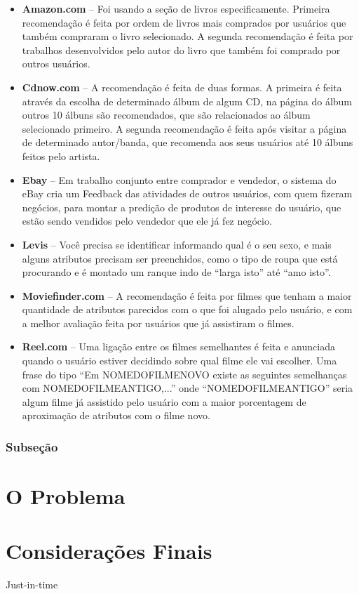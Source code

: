 \documentclass[12pt,
				openright,
				twoside,
				a4paper,
				apter=TITLE,
				section=TITLE,
				subsection=TITLE,
				chapter=TITLE,
				english,
				french,
				spanish,
				brazil]{abntex2}
\begin{document}
\begin{itemize}
\item \textbf{Amazon.com} – Foi usando a seção de livros especificamente. Primeira recomendação é feita por ordem de livros mais comprados por usuários que também compraram o livro selecionado. A segunda recomendação é feita por
trabalhos desenvolvidos pelo autor do livro que também foi comprado por outros usuários. 

\item \textbf{Cdnow.com} – A recomendação é feita de duas formas. A primeira é feita através da escolha de determinado álbum de algum CD, na página do álbum outros 10 álbuns são recomendados, que são relacionados ao álbum selecionado primeiro. A segunda recomendação é feita após visitar a página de determinado autor/banda, que recomenda aos seus usuários até 10 álbuns feitos pelo artista.

\item \textbf{Ebay} – Em trabalho conjunto entre comprador e vendedor, o sistema do eBay cria um Feedback das atividades de outros usuários, com quem fizeram negócios, para montar a predição de produtos de interesse do usuário, que estão sendo vendidos pelo vendedor que ele já fez negócio.

\item \textbf{Levis} – Você precisa se identificar informando qual é o seu sexo, e mais alguns atributos precisam ser preenchidos, como o tipo de roupa que está procurando e é montado um ranque indo de “larga isto” até “amo isto”. 

\item \textbf{Moviefinder.com} – A recomendação é feita por filmes que tenham a  maior quantidade de atributos parecidos com o que foi alugado pelo usuário,  e com a melhor avaliação feita por usuários que já assistiram o filmes. 

\item \textbf{Reel.com} – Uma ligação entre os filmes semelhantes é feita e anunciada quando o usuário estiver decidindo sobre qual filme ele vai escolher. Uma  frase do tipo “Em NOMEDOFILMENOVO existe as seguintes semelhanças  com NOMEDOFILMEANTIGO,...” onde “NOMEDOFILMEANTIGO” seria algum  filme já assistido pelo usuário com a maior porcentagem de aproximação de  atributos com o filme novo.
\end{itemize}

\subsection{Subseção}


\chapter{O Problema}
\chapter{Considerações Finais}
Just-in-time



\end{document}
